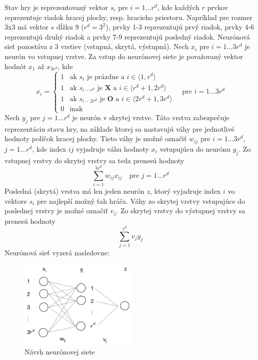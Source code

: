Stav hry je reprezentovaný vektor $s_i$ pre $i=1 \dots r^d$, kde každých $r$ prvkov reprezentuje riadok hracej plochy,
resp. hracieho priestoru.
Napríklad pre rozmer 3x3 má vektor $s$ dĺžku 9 ($r^d=3^2$), prvky 1-3 reprezentujú prvý riadok, prvky 4-6 reprezentujú
druhý riadok a prvky 7-9 reprezentujú posledný riadok.
Neurónová sieť pozostáva z 3 vrstiev (vstupná, skrytá, výstupná).
Nech $x_i$ pre $i=1 \dots 3r^d$ je neurón vo vstupnej vrstve.
Za vstup do neurónovej siete je považovaný vektor hodnôt $x_1$ až $x_{3r^d}$, kde
\begin{equation}
    x_i=
    \begin{cases}
        1 & \text{ak }s_i\text{ je prázdne a } i \in \langle 1, r^d \rangle \\
        1 & \text{ak }s_{i-r^d}\text{ je }\textbf{X}\text{ a } i \in \langle r^d+1, 2r^d \rangle \\
        1 & \text{ak }s_{i-2r^d}\text{ je }\textbf{O}\text{ a } i \in \langle 2r^d+1, 3r^d \rangle \\
        0 & \text{inak}
    \end{cases}
    \quad
    \text{pre }i=1 \dots 3r^d
\end{equation}
Nech $y_j$ pre $j=1 \dots r^d$ je neurón v skrytej vrstve.
Táto vrstva zabezpečuje reprezentáciu stavu hry, na základe ktorej sa nastavujú váhy pre jednotlivé hodnoty políčok
hracej plochy.
Tieto váhy je možné označiť $w_{ij}$ pre $i=1 \dots 3r^d$, $j=1 \dots r^d$, kde index $ij$ vyjadruje váhu hodnoty
$x_i$ vstupujúcu do neurónu $y_j$.
Zo vstupnej vrstvy do skrytej vrstvy sa teda prenesú hodnoty
\begin{equation}
    \sum_{i=1}^{3r^d} w_{ij}x_{ij} \quad \text{pre } j=1 \dots r^d
\end{equation}
Posledná (skrytá) vrstva má len jeden neurón $z$, ktorý vyjadruje index $i$ vo vektore $s_i$ pre najlepší možný ťah
hráča.
Váhy zo skrytej vrstvy vstupujúce do poslednej vrstvy je možné označiť $v_j$.
Zo skrytej vrstvy do výstupnej vrstvy sa prenesú hodnoty
\begin{equation}
    \sum_{j=1}^{r^d} v_{j}y_{j}
\end{equation}
Neurónová sieť vyzerá nasledovne:

\begin{figure}[H]
    \centering
    \includegraphics[width=0.5\textwidth]{images/ann.jpg}
    \caption{Návrh neurónovej siete}
\end{figure}

